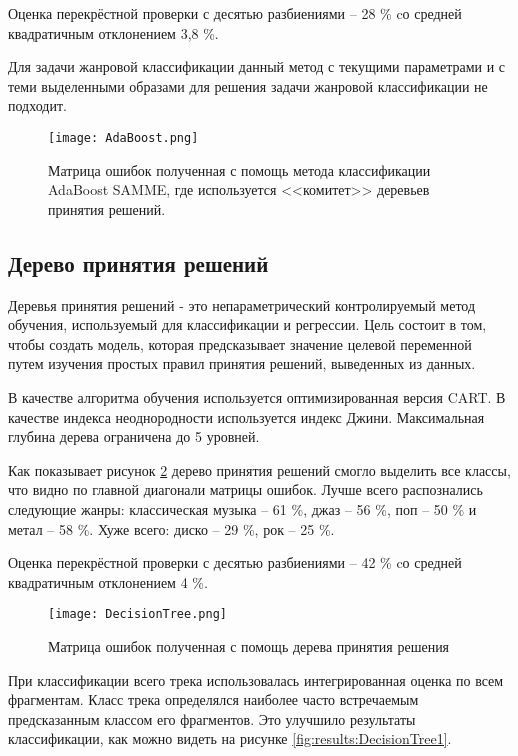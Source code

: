 Оценка перекрёстной проверки с десятью разбиениями -- 28 \% cо средней квадратичным отклонением 3,8 \%.  

Для задачи жанровой классификации данный метод с текущими параметрами и с теми выделенными образами для решения задачи жанровой классификации не подходит. 

\begin{figure}[h]
\centering
  \texttt{[image: AdaBoost.png]}
  \caption{Матрица ошибок полученная с помощь метода классификации AdaBoost SAMME, где используется <<комитет>>  деревьев принятия решений.}
  \label{fig:results:adaboost}
\end{figure}

\subsection{Дерево принятия решений}

Деревья принятия решений - это непараметрический контролируемый метод обучения, используемый для классификации и регрессии. Цель состоит в том, чтобы создать модель, которая предсказывает значение целевой переменной путем изучения простых правил принятия решений, выведенных из данных.

В качестве алгоритма обучения используется оптимизированная версия CART. В качестве индекса неоднородности используется индекс Джини. Максимальная глубина дерева ограничена до 5 уровней.

Как показывает рисунок \ref{fig:results:DecisionTree} дерево принятия решений смогло выделить все классы, что видно по главной диагонали матрицы ошибок. Лучше всего распознались следующие жанры: классическая музыка -- 61 \%, джаз -- 56 \%, поп -- 50 \% и метал -- 58 \%. Хуже всего: диско -- 29 \%, рок -- 25 \%. 


Оценка перекрёстной проверки с десятью разбиениями -- 42 \% cо средней квадратичным отклонением 4 \%.  

\begin{figure}[h]
\centering
  \texttt{[image: DecisionTree.png]}
  \caption{Матрица ошибок полученная с помощь дерева принятия решения}
  \label{fig:results:DecisionTree}
\end{figure}

При классификации всего трека использовалась интегрированная оценка по всем фрагментам. Класс трека определялся наиболее часто встречаемым предсказанным классом его фрагментов. Это улучшило результаты классификации, как можно видеть на рисунке \ref{fig:results:DecisionTree1}. 

